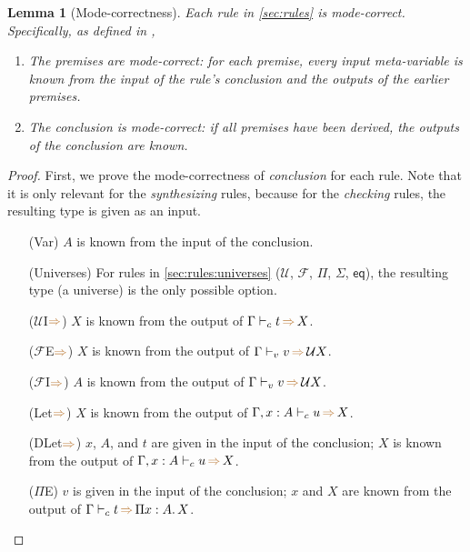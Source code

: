\documentclass[a4,natbib=false]{article}
\newtheorem{lemma}{Lemma}
\newcommand{\ctov}{\mathcal{U}}
\newcommand{\vtoc}{\mathcal{F}}
\newcommand{\comptoval}[1]{\ctov #1}
\newcommand{\pitype}[2]{\Pi {#1}.\,#2}
\newcommand{\infers}{{\color{brown} \Rightarrow}}
\newcommand{\judgecInfer}[3]{{#1} \vdash_{c} {#2} \, \infers \, {#3}}
\newcommand{\judgevInfer}[3]{{#1} \vdash_{v} {#2} \, \infers \, {#3}}
\begin{document}
\begin{lemma}[Mode-correctness]
  Each rule in \cref{sec:rules} is mode-correct. Specifically, as defined in \cite{dunfield2021:bidirectional},
  \begin{enumerate}
    \item The premises are mode-correct: for each premise, every input meta-variable is known from the input of the rule's conclusion and the outputs of the earlier premises.
    \item The conclusion is mode-correct: if all premises have been derived, the outputs of the conclusion are known.
  \end{enumerate}
\end{lemma}
\begin{proof}
  First, we prove the mode-correctness of \emph{conclusion} for each rule.
  Note that it is only relevant for the \emph{synthesizing} rules, because for the \emph{checking} rules, the resulting type is given as an input.

  \begin{multicols}{2}
  \begin{itemize}
  \item[(Var)]
    $A$ is known from the input of the conclusion.
  \item[(Universes)]
    For rules in \cref{sec:rules:universes} ($\ctov$, $\vtoc$, $\Pi$,
    $\Sigma$, $\mathsf{eq}$), the resulting type (a universe) is the only
    possible option.

  \item[($\ctov$I$\infers$)]
    $X$ is known from the output of $\judgecInfer{\Gamma}{t}{X}$.

  \item[($\vtoc$E$\infers$)]
    $X$ is known from the output of $\judgevInfer{\Gamma}{v}{\comptoval{X}}$.

  \item[($\vtoc$I$\infers$)]
    $A$ is known from the output of $\judgevInfer{\Gamma}{v}{\comptoval{X}}$.

  \item[(Let$\infers$)]
    $X$ is known from the output of $\judgecInfer{\Gamma, x : A}{u}{X}$.

  \item[(DLet$\infers$)]
    $x$, $A$, and $t$ are given in the input of the conclusion; $X$ is known
    from the output of $\judgecInfer{\Gamma, x:A}{u}{X}$.

  \item[($\Pi$E)]
    $v$ is given in the input of the conclusion; $x$ and $X$ are known from the
    output of $\judgecInfer{\Gamma}{t}{\pitype{x:A}{X}}$.


\end{itemize}
\end{multicols}
\end{proof}
\end{document}
